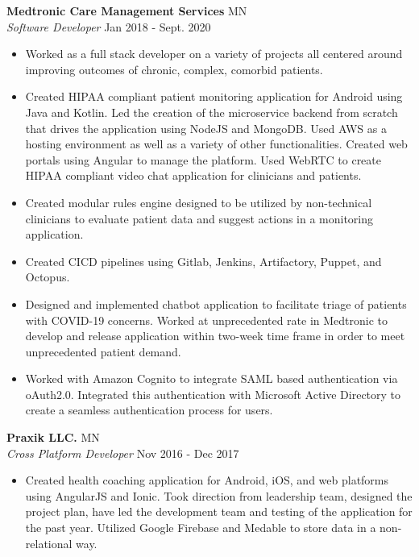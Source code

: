 \documentclass[a4paper]{article}
\begin{document}
\textbf{Medtronic Care Management Services} \hfill MN\\
\textit{Software Developer} \hfill Jan 2018 - Sept. 2020\\
\vspace{-1mm}
\begin{itemize} \itemsep 1pt
	\item Worked as a full stack developer on a variety of projects all centered around improving outcomes of chronic, complex, comorbid patients.
	\item Created HIPAA compliant patient monitoring application for Android using Java and Kotlin. Led the creation of the microservice backend from scratch that drives the application using NodeJS and MongoDB. Used AWS as a hosting environment as well as a variety of other functionalities. Created web portals using Angular to manage the platform. Used WebRTC to create HIPAA compliant video chat application for clinicians and patients.
	\item Created modular rules engine designed to be utilized by non-technical clinicians to evaluate patient data and suggest actions in a monitoring application.
	\item Created CICD pipelines using Gitlab, Jenkins, Artifactory, Puppet, and Octopus.
	\item Designed and implemented chatbot application to facilitate triage of patients with COVID-19 concerns. Worked at unprecedented rate in Medtronic to develop and release application within two-week time frame in order to meet unprecedented patient demand.
	\item Worked with Amazon Cognito to integrate SAML based authentication via oAuth2.0. Integrated this authentication with Microsoft Active Directory to create a seamless authentication process for users.
\end{itemize}
\textbf{Praxik LLC.} \hfill MN\\
\textit{Cross Platform Developer} \hfill Nov 2016 - Dec 2017\\
\vspace{-1mm}
\begin{itemize} \itemsep 1pt
	\item Created health coaching application for Android, iOS, and web platforms using AngularJS and Ionic. Took direction from leadership team, designed the project plan, have led the development team and testing of the application for the past year. Utilized Google Firebase and Medable to store data in a non-relational way.
\end{itemize}
\end{document}
